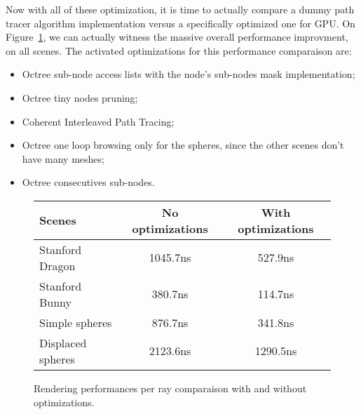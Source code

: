Now with all of these optimization, it is time to actually compare a dummy
path tracer algorithm implementation versus a specifically optimized one for GPU.
On Figure~\ref{table:final_perfs}, we can actually witness the massive overall
performance improvment, on all scenes. The activated optimizations for this
performance comparaison are:

\begin{itemize}
    \item Octree sub-node access lists with the node's sub-nodes mask implementation;
    \item Octree tiny nodes pruning;
    \item Coherent Interleaved Path Tracing;
    \item Octree one loop browsing only for the spheres, since the other scenes
        don't have many meshes;
    \item Octree consecutives sub-nodes.
\end{itemize}

\begin{figure}[H]
    \tiny
    \centering
    \begin{tabular}{ | l | c | c | }
        \hline
        Scenes & No optimizations & With optimizations \\
        \hline
        Stanford Dragon & 1045.7ns & 527.9ns \\
        Stanford Bunny & 380.7ns & 114.7ns \\
        Simple spheres & 876.7ns & 341.8ns \\
        Displaced spheres & 2123.6ns & 1290.5ns \\
        \hline
    \end{tabular}
    \caption{
        Rendering performances per ray comparaison with and without
        optimizations.
    }
    \label{table:final_perfs}
\end{figure}
